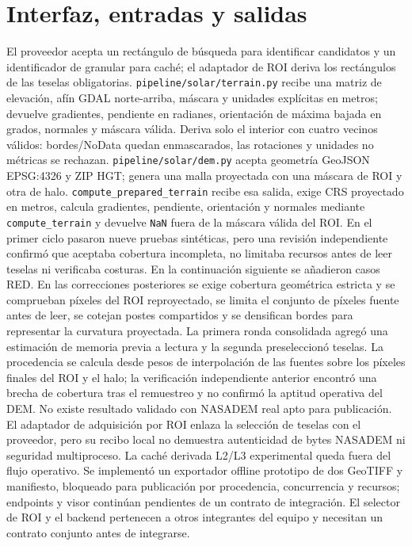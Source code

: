 \documentclass[11pt,a4paper]{article}
\begin{document}
\section{Interfaz, entradas y salidas}
El proveedor acepta un rectángulo de búsqueda para identificar candidatos y un identificador de granular para caché; el adaptador de ROI deriva los rectángulos de las teselas obligatorias. \texttt{pipeline/solar/terrain.py} recibe una matriz de elevación, afín GDAL norte-arriba, máscara y unidades explícitas en metros; devuelve gradientes, pendiente en radianes, orientación de máxima bajada en grados, normales y máscara válida. Deriva solo el interior con cuatro vecinos válidos: bordes/NoData quedan enmascarados, las rotaciones y unidades no métricas se rechazan. \texttt{pipeline/solar/dem.py} acepta geometría GeoJSON EPSG:4326 y ZIP HGT; genera una malla proyectada con una máscara de ROI y otra de halo. \texttt{compute\_prepared\_terrain} recibe esa salida, exige CRS proyectado en metros, calcula gradientes, pendiente, orientación y normales mediante \texttt{compute\_terrain} y devuelve \texttt{NaN} fuera de la máscara válida del ROI. En el primer ciclo pasaron nueve pruebas sintéticas, pero una revisión independiente confirmó que aceptaba cobertura incompleta, no limitaba recursos antes de leer teselas ni verificaba costuras. En la continuación siguiente se añadieron casos RED. En las correcciones posteriores se exige cobertura geométrica estricta y se comprueban píxeles del ROI reproyectado, se limita el conjunto de píxeles fuente antes de leer, se cotejan postes compartidos y se densifican bordes para representar la curvatura proyectada. La primera ronda consolidada agregó una estimación de memoria previa a lectura y la segunda preseleccionó teselas. La procedencia se calcula desde pesos de interpolación de las fuentes sobre los píxeles finales del ROI y el halo; la verificación independiente anterior encontró una brecha de cobertura tras el remuestreo y no confirmó la aptitud operativa del DEM. No existe resultado validado con NASADEM real apto para publicación. El adaptador de adquisición por ROI enlaza la selección de teselas con el proveedor, pero su recibo local no demuestra autenticidad de bytes NASADEM ni seguridad multiproceso. La caché derivada L2/L3 experimental queda fuera del flujo operativo. Se implementó un exportador offline prototipo de dos GeoTIFF y manifiesto, bloqueado para publicación por procedencia, concurrencia y recursos; endpoints y visor continúan pendientes de un contrato de integración. El selector de ROI y el backend pertenecen a otros integrantes del equipo y necesitan un contrato conjunto antes de integrarse.
\end{document}
